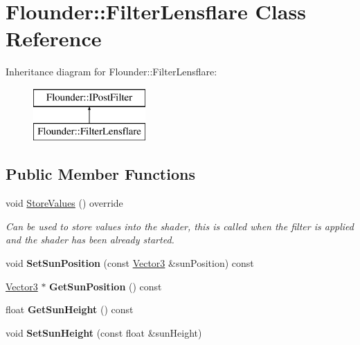 \hypertarget{class_flounder_1_1_filter_lensflare}{}\section{Flounder\+:\+:Filter\+Lensflare Class Reference}
\label{class_flounder_1_1_filter_lensflare}
Inheritance diagram for Flounder\+:\+:Filter\+Lensflare\+:\begin{figure}[H]
\begin{center}
\leavevmode
\includegraphics[height=2.000000cm]{class_flounder_1_1_filter_lensflare}
\end{center}
\end{figure}
\subsection*{Public Member Functions}
\begin{DoxyCompactItemize}
\item 
void \hyperlink{class_flounder_1_1_filter_lensflare_ae597fe90e24f1f2df20c0dec51ea423c}{Store\+Values} () override
\begin{DoxyCompactList}\small\item\em Can be used to store values into the shader, this is called when the filter is applied and the shader has been already started. \end{DoxyCompactList}\item 
\mbox{\label{class_flounder_1_1_filter_lensflare_ad7fa9d1bfe46ab397af2a5281e62b498}} 
void {\bfseries Set\+Sun\+Position} (const \hyperlink{class_flounder_1_1_vector3}{Vector3} \&sun\+Position) const
\item 
\mbox{\label{class_flounder_1_1_filter_lensflare_a972c20b3f102a36d926112323770523d}} 
\hyperlink{class_flounder_1_1_vector3}{Vector3} $\ast$ {\bfseries Get\+Sun\+Position} () const
\item 
\mbox{\label{class_flounder_1_1_filter_lensflare_a192a6324576aec91d3b028f7a2a30317}} 
float {\bfseries Get\+Sun\+Height} () const
\item 
\mbox{\label{class_flounder_1_1_filter_lensflare_a2639e8c4c9a314a5ad284f4d5cbce7d2}} 
void {\bfseries Set\+Sun\+Height} (const float \&sun\+Height)
\end{DoxyCompactItemize}
